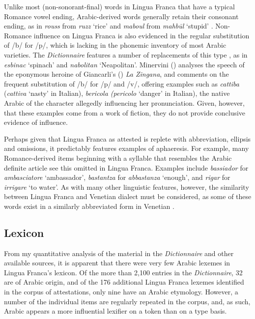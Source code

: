 \documentclass[output=paper]{langsci/langscibook}
\begin{document}
	Unlike most (non-sonorant-final) words in Lingua Franca that have a typical Romance vowel ending, Arabic-derived words generally retain their consonant ending, as in \textit{rouss} from \textit{ruzz} ‘rice’ and \textit{maboul} from \textit{mahbūl} ‘stupid’ \citep[38]{Cifoletti2004}. Non-Romance influence on Lingua Franca is also evidenced in the regular substitution of /b/ for /p/, which is lacking in the phonemic inventory of most Arabic varieties. The \textit{Dictionnaire} features a number of replacements of this type \citep[38]{Cifoletti2004}, as in \textit{esbinac} ‘spinach’ and \textit{nabolitan} ‘Neapolitan’.  Minervini (\citeyear[257–60]{Minervini1996}) analyses the speech of the eponymous heroine of Giancarli’s (\citeyear{Giancarli1545}) \textit{La Zingana}, and comments on the frequent substitution of /b/ for /p/ and /v/, offering examples such as \textit{cattiba} (\textit{cattiva} ‘nasty’ in Italian), \textit{bericola (pericolo} ‘danger’ in Italian), the native Arabic of the character allegedly influencing her pronunciation. Given, however, that these examples come from a work of fiction, they do not provide conclusive evidence of influence. 
	
	Perhaps given that Lingua Franca as attested is replete with abbreviation, ellipsis and omissions, it predictably features examples of aphaeresis. For example, many Romance-derived items beginning with a syllable that resembles the Arabic definite article see this omitted in Lingua Franca. Examples include \textit{bassiador} for \textit{ambasciatore} ‘ambassador’, \textit{bastantza} for \textit{abbastanza} ‘enough’, and \textit{rigar} for \textit{irrigare} ‘to water’. As with many other linguistic features, however, the similarity between Lingua Franca and Venetian dialect must be considered, as some of these words exist in a similarly abbreviated form in Venetian \citep{Schuchardt1909}.
	
\subsection{Lexicon}
	
	From my quantitative analysis of the material in the \textit{Dictionnaire} and other available sources, it is apparent that there were very few Arabic lexemes in Lingua Franca’s lexicon. Of the more than 2,100 entries in the \textit{Dictionnaire}, 32 are of Arabic origin, and of the 176 additional Lingua Franca lexemes identified in the corpus of attestations, only nine have an Arabic etymology. However, a number of the individual items are regularly repeated in the corpus, and, as such, Arabic appears a more influential lexifier on a token than on a type basis.
	
\end{document}
